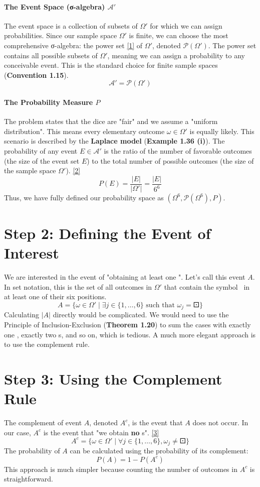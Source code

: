 \documentclass[11pt,a4paper]{article}
\begin{document}
\paragraph{The Event Space (σ-algebra) $\mathcal{A}'$}
The event space is a collection of subsets of $\Omega'$ for which we can assign probabilities. Since our sample space $\Omega'$ is finite, we can choose the most comprehensive σ-algebra: the power set \hyperlink{note:powerset}{[1]} of $\Omega'$, denoted $\mathcal{P}(\Omega')$. The power set contains all possible subsets of $\Omega'$, meaning we can assign a probability to any conceivable event. This is the standard choice for finite sample spaces (\textbf{Convention 1.15}).
\[
\mathcal{A}' = \mathcal{P}(\Omega')
\]

\paragraph{The Probability Measure $P$}
The problem states that the dice are "fair" and we assume a "uniform distribution". This means every elementary outcome $\omega \in \Omega'$ is equally likely. This scenario is described by the \textbf{Laplace model} (\textbf{Example 1.36 (i)}). The probability of any event $E \in \mathcal{A}'$ is the ratio of the number of favorable outcomes (the size of the event set $E$) to the total number of possible outcomes (the size of the sample space $\Omega'$). \hyperlink{note:laplace}{[2]}
\[
P(E) = \frac{|E|}{|\Omega'|} = \frac{|E|}{6^6}
\]
Thus, we have fully defined our probability space as $(\Omega^6, \mathcal{P}(\Omega^6), P)$.

\section{Step 2: Defining the Event of Interest}

We are interested in the event of "obtaining at least one \dicei". Let's call this event $A$. In set notation, this is the set of all outcomes in $\Omega'$ that contain the symbol \dicei\ in at least one of their six positions.
\[
A = \{ \omega \in \Omega' \mid \exists j \in \{1, \dots, 6\} \text{ such that } \omega_j = \dicei \}
\]
Calculating $|A|$ directly would be complicated. We would need to use the Principle of Inclusion-Exclusion (\textbf{Theorem 1.20}) to sum the cases with exactly one \dicei, exactly two \dicei s, and so on, which is tedious. A much more elegant approach is to use the complement rule.

\section{Step 3: Using the Complement Rule}
The complement of event $A$, denoted $A^c$, is the event that $A$ does not occur. In our case, $A^c$ is the event that "we obtain \textbf{no} \dicei s". \hyperlink{note:complement}{[3]}
\[
A^c = \{ \omega \in \Omega' \mid \forall j \in \{1, \dots, 6\}, \omega_j \neq \dicei \}
\]
The probability of $A$ can be calculated using the probability of its complement:
\[
P(A) = 1 - P(A^c)
\]
This approach is much simpler because counting the number of outcomes in $A^c$ is straightforward.
\end{document}
